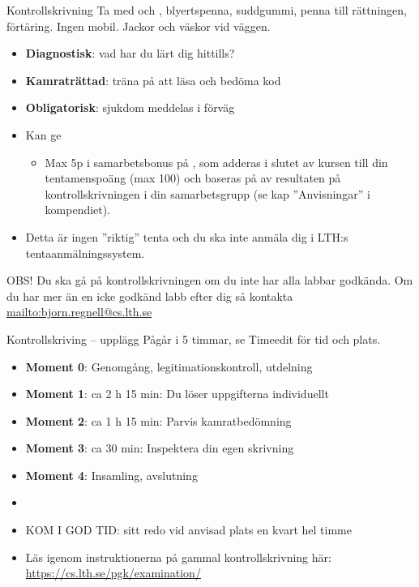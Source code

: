 


\begin{Slide}{Kontrollskrivning}\SlideFontSmall
Ta med  och , blyertspenna, suddgummi,  penna till rättningen, förtäring. Ingen mobil. Jackor och väskor vid väggen.
\begin{itemize}
  \item \textbf{Diagnostisk}: vad har du lärt dig hittills?
  \item \textbf{Kamraträttad}: träna på att läsa och bedöma kod
  \item \textbf{Obligatorisk}: sjukdom  meddelas i förväg
  \item Kan ge  
  \begin{itemize}\SlideFontTiny
    \item[] Max 5p i samarbetsbonus på , som adderas i slutet av kursen till din tentamenspoäng (max 100) och baseras på  av resultaten på kontrollskrivningen i din samarbetsgrupp (se kap ''Anvisningar'' i kompendiet).
  \end{itemize}
  \ifkompendium\else
  \item Detta är ingen ''riktig'' tenta och du ska inte anmäla dig i LTH:s tentaanmälningssystem.
  \fi
\end{itemize}
OBS! Du ska gå på kontrollskrivningen  om du inte har alla labbar godkända. Om du har mer än en icke godkänd labb efter dig så kontakta \url{mailto:bjorn.regnell@cs.lth.se}
\end{Slide}

\begin{Slide}{Kontrollskriving -- upplägg}\SlideFontSmall
Pågår i 5 timmar, se Timeedit för tid och plats.
\begin{itemize}
\item \textbf{Moment 0}: Genomgång, legitimationskontroll, utdelning
\item \textbf{Moment 1}: ca 2 h 15 min: Du löser uppgifterna individuellt
\item \textbf{Moment 2}: ca 1 h 15 min: Parvis kamratbedömning
\item \textbf{Moment 3}: ca 30 min: Inspektera din egen skrivning
\item \textbf{Moment 4}: Insamling, avslutning
\item[]
\item KOM I GOD TID: sitt redo vid anvisad plats en kvart  hel timme
\item Läs  igenom instruktionerna på gammal kontrollskrivning här: 
\url{https://cs.lth.se/pgk/examination/}

\end{itemize}


\end{Slide}

